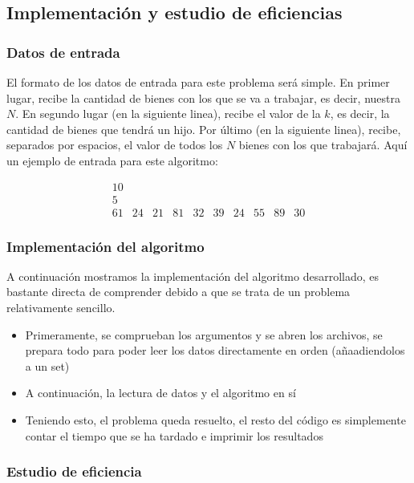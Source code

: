 \documentclass{article}
\begin{document}
\subsection{Implementación y estudio de eficiencias}
\subsubsection{Datos de entrada}
El formato de los datos de entrada para este problema será simple. En primer lugar, recibe la cantidad de bienes con los que se va a trabajar, es decir, nuestra $N$. En segundo lugar (en la siguiente linea), recibe el valor de la $k$, es decir, la cantidad de bienes que tendrá un hijo. Por último (en la siguiente linea), recibe, separados por espacios, el valor de todos los $N$ bienes con los que trabajará. Aquí un ejemplo de entrada para este algoritmo: \newline

$$\begin{matrix}
    10 \\ 5 \\ 61 & 24 & 21 & 81 & 32 & 39 & 24 & 55 & 89 & 30
\end{matrix}$$

\subsubsection{Implementación del algoritmo}
A continuación mostramos la implementación del algoritmo desarrollado, es bastante directa de comprender debido a que se trata de un problema relativamente sencillo.
\begin{itemize}
    \item Primeramente, se comprueban los argumentos y se abren los archivos, se prepara todo para poder leer los datos directamente en orden (añaadiendolos a un set)
 
\item A continuación, la lectura de datos y el algoritmo en sí


\item Teniendo esto, el problema queda resuelto, el resto del código es simplemente contar el tiempo que se ha tardado e imprimir los resultados



\end{itemize}
\subsubsection{Estudio de eficiencia}
\end{document}
